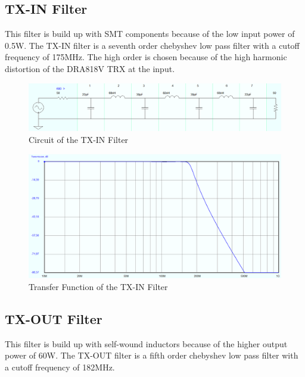 \subsection{TX-IN Filter}
This filter is build up with SMT components because of the low input power of 0.5W.
The TX-IN filter is a seventh order chebyshev low pass filter with a cutoff frequency of 175MHz.
The high order is chosen because of the high harmonic distortion of the DRA818V \acs{TRX} at the input.
\begin{figure}[ht!]
	\centering
	\includegraphics[width = 17cm]{./2_circuit/fig/TX-IN Filter_Circuit}
	\caption{Circuit of the TX-IN Filter}
	\label{fig:TX-IN Filter_Circuit}
\end{figure}
\bigskip
\begin{figure}[ht!]
	\centering
	\includegraphics[width = 17cm]{./2_circuit/fig/TX-IN Filter_TF}
	\caption{Transfer Function of the TX-IN Filter}
	\label{fig:TX-IN Filter_TF}
\end{figure}

\newpage
\subsection{TX-OUT Filter}
This filter is build up with self-wound inductors because of the higher output power of 60W.
The TX-OUT filter is a fifth order chebyshev low pass filter with a cutoff frequency of 182MHz.

